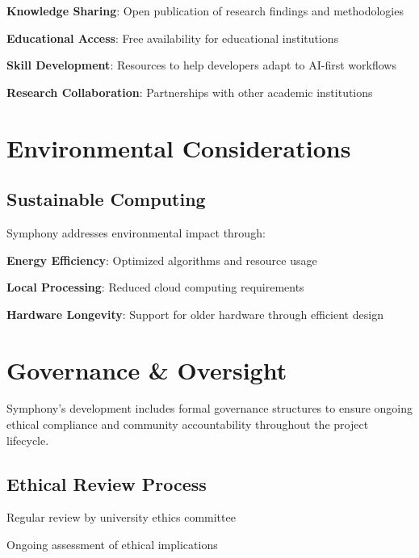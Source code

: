 \begin{compactlist}
    \item \textbf{Knowledge Sharing}: Open publication of research findings and methodologies
    \item \textbf{Educational Access}: Free availability for educational institutions
    \item \textbf{Skill Development}: Resources to help developers adapt to AI-first workflows
    \item \textbf{Research Collaboration}: Partnerships with other academic institutions
\end{compactlist}

\section*{Environmental Considerations}

\subsection*{Sustainable Computing}
Symphony addresses environmental impact through:

\begin{compactlist}
    \item \textbf{Energy Efficiency}: Optimized algorithms and resource usage
    \item \textbf{Local Processing}: Reduced cloud computing requirements
    \item \textbf{Hardware Longevity}: Support for older hardware through efficient design
\end{compactlist}

\section*{Governance \& Oversight}

\begin{successbox}
Symphony's development includes formal governance structures to ensure ongoing ethical compliance and community accountability throughout the project lifecycle.
\end{successbox}

\subsection*{Ethical Review Process}
\begin{description}[leftmargin=3cm,labelwidth=2.5cm]
    \item[\textbf{Ethics Board}] Regular review by university ethics committee
    \item[\textbf{Continuous Monitoring}] Ongoing assessment of ethical implications
\end{description}

